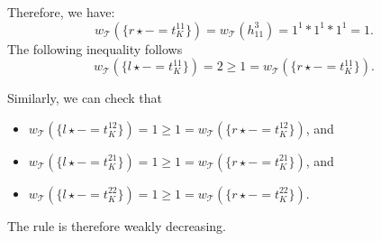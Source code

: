 \begin{example}
\begin{center}
    \end{center}
    Therefore, we have: 
        $$w_\mathcal{T}(\{r \mathop{\star} - \mathop{=} t_K^{11}\}) \mathop{=} w_\mathcal{T}(h_{11}^3) \mathop{=} 1^1 * 1^1 * 1 ^ 1 \mathop{=} 1.$$ 
    The following inequality follows
     $$w_\mathcal{T}(\{l \mathop{\star} - \mathop{=} t_K^{11}\}) \mathop{=} 2 \mathop{\geq} 1 \mathop{=} w_\mathcal{T}(\{r \mathop{\star} - \mathop{=} t_K^{11}\}).$$

    Similarly, we can check that
        \begin{itemize}
            \item $w_\mathcal{T}(\{l \mathop{\star} - \mathop{=} t_K^{12}\}) \mathop{=} 1 \mathop{\geq} 1 \mathop{=} w_\mathcal{T}(\{r \mathop{\star} - \mathop{=} t_K^{12}\})$, and
            \item $w_\mathcal{T}(\{l \mathop{\star} - \mathop{=} t_K^{21}\}) \mathop{=} 1 \mathop{\geq} 1 \mathop{=} w_\mathcal{T}(\{r \mathop{\star} - \mathop{=} t_K^{21}\})$, and
            \item $w_\mathcal{T}(\{l \mathop{\star} - \mathop{=} t_K^{22}\}) \mathop{=} 1 \mathop{\geq} 1 \mathop{=} w_\mathcal{T}(\{r \mathop{\star} - \mathop{=} t_K^{22}\})$.
        \end{itemize}  
     The rule is therefore weakly decreasing.


\end{example}
